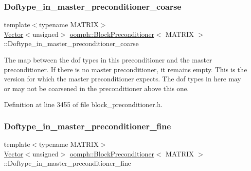 \mbox{\label{classoomph_1_1BlockPreconditioner_a2d341eaf3312c7afcd663c7f4eba6fc2}} 
\subsubsection{\texorpdfstring{Doftype\+\_\+in\+\_\+master\+\_\+preconditioner\+\_\+coarse}{Doftype\_in\_master\_preconditioner\_coarse}}
{\footnotesize\ttfamily template$<$typename M\+A\+T\+R\+IX$>$ \\
\hyperlink{classoomph_1_1Vector}{Vector}$<$unsigned$>$ \hyperlink{classoomph_1_1BlockPreconditioner}{oomph\+::\+Block\+Preconditioner}$<$ M\+A\+T\+R\+IX $>$\+::Doftype\+\_\+in\+\_\+master\+\_\+preconditioner\+\_\+coarse\hspace{0.3cm}{\ttfamily [private]}}



The map between the dof types in this preconditioner and the master preconditioner. If there is no master preconditioner, it remains empty. This is the version for which the master preconditioner expects. The dof types in here may or may not be coarsened in the preconditioner above this one. 



Definition at line 3455 of file block\+\_\+preconditioner.\+h.

\mbox{\label{classoomph_1_1BlockPreconditioner_ae8c06ce4f4baf8480a2f25b152031dad}} 
\subsubsection{\texorpdfstring{Doftype\+\_\+in\+\_\+master\+\_\+preconditioner\+\_\+fine}{Doftype\_in\_master\_preconditioner\_fine}}
{\footnotesize\ttfamily template$<$typename M\+A\+T\+R\+IX$>$ \\
\hyperlink{classoomph_1_1Vector}{Vector}$<$unsigned$>$ \hyperlink{classoomph_1_1BlockPreconditioner}{oomph\+::\+Block\+Preconditioner}$<$ M\+A\+T\+R\+IX $>$\+::Doftype\+\_\+in\+\_\+master\+\_\+preconditioner\+\_\+fine\hspace{0.3cm}{\ttfamily [private]}}



